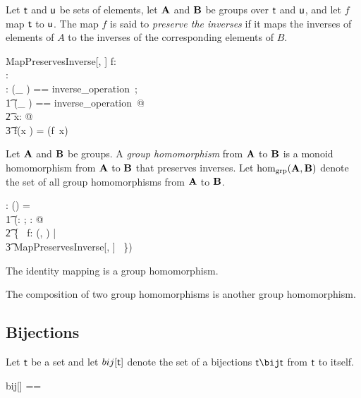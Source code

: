 \documentclass{amsart}
\begin{document}
Let $\mathsf{t}$ and $\mathsf{u}$ be sets of elements,
let $\mathbf{A}$ and $\mathbf{B}$ be groups over $\mathsf{t}$ and $\mathsf{u}$, 
and let $f$ map $\mathsf{t}$ to $\mathsf{u}$.
The map $f$ is said to {\em preserve the inverses} if it maps the inverses of elements of $A$
to the inverses of the corresponding elements of $B$.
\begin{schema}{MapPreservesInverse}[\genT, \genU]
	f: \genT \pfun \genU \\
	\strucA: \group \genT \\	
	\strucB: \group \genU
\where
	\LET (\_ \invG) == inverse\_operation~\strucA; \\
	\t1	(\_ \daggerG) == inverse\_operation~\strucB @ \\
	\t2		\forall x: \genT @ \\
	\t3			f(x \invG) = (f~x) \daggerG
\end{schema}

Let $\mathbf{A}$ and $\mathbf{B}$ be groups.
A {\em group homomorphism} from $\mathbf{A}$ to $\mathbf{B}$ is a monoid homomorphism
from $\mathbf{A}$ to $\mathbf{B}$ that preserves inverses.
Let $\operatorname{hom_{grp}}(\mathbf{A}, \mathbf{B})$ denote the set of all group homomorphisms from $\mathbf{A}$ to $\mathbf{B}$.
\begin{gendef}[\genT, \genU]
	\homGroup: \group \genT \cross \group \genU \fun \power (\genT \fun \genU)
\where
	\homGroup = \\
	\t1	(\lambda \strucA: \group \genT; \strucB: \group \genU @ \\
	\t2		\{~ f: \homMonoid(\strucA, \strucB) | \\
	\t3			MapPreservesInverse[\genT, \genU] ~\})
\end{gendef}

\begin{remark}
The identity mapping is a group homomorphism.
\end{remark}

\begin{remark}
The composition of two group homomorphisms is another group homomorphism.
\end{remark}

\subsection{Bijections}

Let $\mathsf{t}$ be a set and let $bij[\mathsf{t}]$ denote the set of a bijections $\genT \bij \genT$ from $\mathsf{t}$ to itself.
\begin{zed}
	bij[\genT] == \genT \bij \genT
\end{zed}
\end{document}
